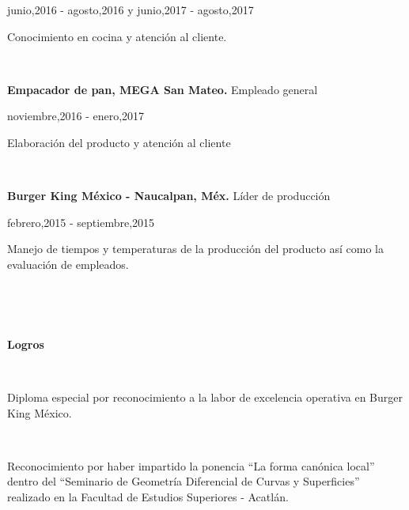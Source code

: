 \documentclass[10pt]{article}
\begin{document}
junio,2016 - agosto,2016 y junio,2017 - agosto,2017

Conocimiento en cocina y atenci\'on al cliente.

\ 

\textbf{Empacador de pan, MEGA San Mateo.}
Empleado general


noviembre,2016 - enero,2017

Elaboraci\'on del producto y atenci\'on al cliente

\ 

\textbf{Burger King M\'exico - Naucalpan, M\'ex. 
}L\'ider de producci\'on


 
febrero,2015 - septiembre,2015

Manejo de tiempos y temperaturas de la producci\'on del producto así como la evaluaci\'on de empleados.

\ 




\ 

\begin{large}
\textbf{Logros}
\end{large}


\ 

Diploma especial por reconocimiento a la labor de excelencia operativa en Burger King M\'exico.

\ 

Reconocimiento por haber impartido la ponencia ``La forma canónica local''  dentro del ``Seminario de Geometría Diferencial de Curvas y Superficies''  realizado en la Facultad de Estudios Superiores - Acatlán.
\end{document}
